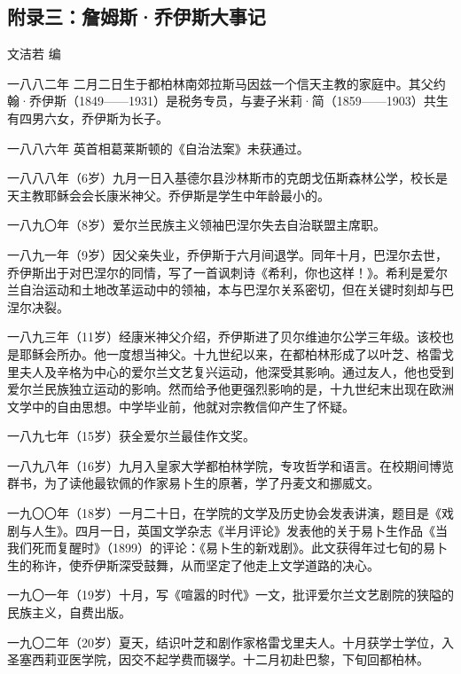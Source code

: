 \clearpage
\subsection*{附录三：詹姆斯·乔伊斯大事记}

\begin{center}
    \par 文洁若 编
\end{center}

\par 一八八二年 二月二日生于都柏林南郊拉斯马因兹一个信天主教的家庭中。其父约翰·乔伊斯（1849——1931）是税务专员，与妻子米莉·简（1859——1903）共生有四男六女，乔伊斯为长子。
\par 一八八六年 英首相葛莱斯顿的《自治法案》未获通过。
\par 一八八八年（6岁）九月一日入基德尔县沙林斯市的克朗戈伍斯森林公学，校长是天主教耶稣会会长康米神父。乔伊斯是学生中年龄最小的。
\par 一八九〇年（8岁）爱尔兰民族主义领袖巴涅尔失去自治联盟主席职。
\par 一八九一年（9岁）因父亲失业，乔伊斯于六月间退学。同年十月，巴涅尔去世，乔伊斯出于对巴涅尔的同情，写了一首讽刺诗《希利，你也这样！》。希利是爱尔兰自治运动和土地改革运动中的领袖，本与巴涅尔关系密切，但在关键时刻却与巴涅尔决裂。
\par 一八九三年（11岁）经康米神父介绍，乔伊斯进了贝尔维迪尔公学三年级。该校也是耶稣会所办。他一度想当神父。十九世纪以来，在都柏林形成了以叶芝、格雷戈里夫人及辛格为中心的爱尔兰文艺复兴运动，他深受其影响。通过友人，他也受到爱尔兰民族独立运动的影响。然而给予他更强烈影响的是，十九世纪末出现在欧洲文学中的自由思想。中学毕业前，他就对宗教信仰产生了怀疑。
\par 一八九七年（15岁）获全爱尔兰最佳作文奖。
\par 一八九八年（16岁）九月入皇家大学都柏林学院，专攻哲学和语言。在校期间博览群书，为了读他最钦佩的作家易卜生的原著，学了丹麦文和挪威文。
\par 一九〇〇年（18岁）一月二十日，在学院的文学及历史协会发表讲演，题目是《戏剧与人生》。四月一日，英国文学杂志《半月评论》发表他的关于易卜生作品《当我们死而复醒时》（1899）的评论：《易卜生的新戏剧》。此文获得年过七旬的易卜生的称许，使乔伊斯深受鼓舞，从而坚定了他走上文学道路的决心。
\par 一九〇一年（19岁）十月，写《喧嚣的时代》一文，批评爱尔兰文艺剧院的狭隘的民族主义，自费出版。
\par 一九〇二年（20岁）夏天，结识叶芝和剧作家格雷戈里夫人。十月获学士学位，入圣塞西莉亚医学院，因交不起学费而辍学。十二月初赴巴黎，下旬回都柏林。
